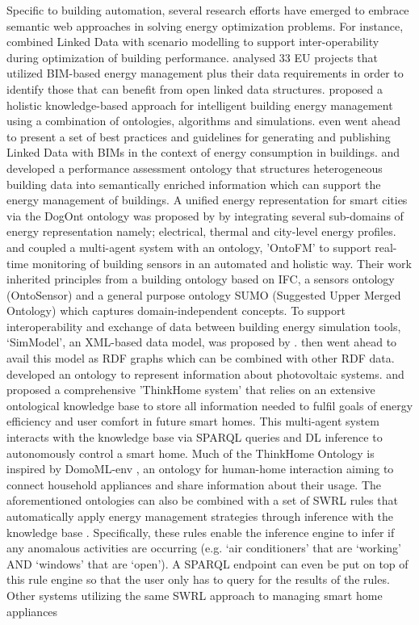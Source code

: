 Specific to building automation, several research efforts have emerged to embrace semantic web approaches in solving energy optimization problems. For instance, \cite{Curry2012} combined Linked Data with scenario modelling to support inter-operability during optimization of building performance. \cite{Msc2016} analysed 33 EU projects that utilized \ac{BIM}-based energy management plus their data requirements in order to identify those that can benefit from open linked data structures. \cite{Anzaldi2014} proposed a holistic knowledge-based approach for intelligent building energy management using a combination of ontologies, algorithms and simulations.  \cite{Radulovic2015} even went ahead to present a set of best practices and guidelines for generating and publishing Linked Data with \acp{BIM} in the context of energy consumption in buildings. \cite{Corry2015} and \cite{Scherer2012} developed a performance assessment ontology that structures heterogeneous building data into semantically enriched information which can support the energy management of buildings. A unified energy representation for smart cities via the DogOnt ontology was proposed by \cite{Bonino2018} by integrating several sub-domains of energy representation namely; electrical, thermal and city-level energy profiles. \cite{Dibley2011} and \cite{Dibley2012} coupled a multi-agent system with an ontology, 'OntoFM' to support real-time monitoring of building sensors in an automated and holistic way. Their work inherited principles from a building ontology based on \ac{IFC}, a sensors ontology (OntoSensor) \citep{Russomanno2005} and a general purpose ontology SUMO (Suggested Upper Merged Ontology) \citep{Niles2001} which captures domain-independent concepts. To support interoperability and exchange of data between building energy simulation tools, `SimModel', an XML-based data model, was proposed by \cite{Donnell2011}.  \cite{Pauwels2014,Pauwels2014a} then went ahead to avail this model as \ac{RDF} graphs which can be combined with other \ac{RDF} data. \cite{Tah2011} developed an ontology to represent information about photovoltaic systems. \cite{Reinisch2011} and \cite{Kofler2012} proposed a comprehensive 'ThinkHome system' that relies on an extensive ontological knowledge base to store all information needed to fulfil goals of energy efficiency and user comfort in future smart homes. This multi-agent system interacts with the knowledge base via \ac{SPARQL} queries and \ac{DL} inference to autonomously control a smart home. Much of the ThinkHome Ontology is inspired by DomoML-env \citep{Sommaruga2005}, an ontology for human-home interaction aiming to connect household appliances and share information about their usage. The aforementioned ontologies can also be combined with a set of \ac{SWRL} rules that automatically apply energy management strategies through inference with the knowledge base \cite{Rossello-Busquet2011}. Specifically, these rules enable the inference engine to infer if any anomalous activities are occurring (e.g. `air conditioners' that are `working' AND `windows' that are `open'). A \ac{SPARQL} endpoint can even be put on top of this rule engine so that the user only has to query for the results of the rules. Other systems utilizing the same \ac{SWRL} approach to managing smart home appliances 